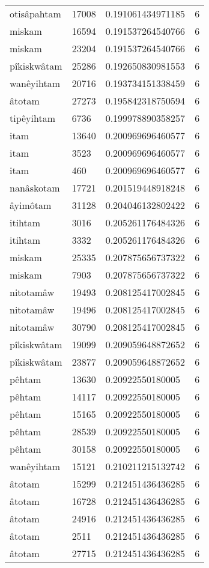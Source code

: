 \begin{longtable}{llll}
otisâpahtam & 17008 & 0.191061434971185 & 6 \\
miskam & 16594 & 0.191537264540766 & 6 \\
miskam & 23204 & 0.191537264540766 & 6 \\
pîkiskwâtam & 25286 & 0.192650830981553 & 6 \\
wanêyihtam & 20716 & 0.193734151338459 & 6 \\
âtotam & 27273 & 0.195842318750594 & 6 \\
tipêyihtam & 6736 & 0.199978890358257 & 6 \\
itam & 13640 & 0.200969696460577 & 6 \\
itam & 3523 & 0.200969696460577 & 6 \\
itam & 460 & 0.200969696460577 & 6 \\
nanâskotam & 17721 & 0.201519448918248 & 6 \\
âyimôtam & 31128 & 0.204046132802422 & 6 \\
itihtam & 3016 & 0.205261176484326 & 6 \\
itihtam & 3332 & 0.205261176484326 & 6 \\
miskam & 25335 & 0.207875656737322 & 6 \\
miskam & 7903 & 0.207875656737322 & 6 \\
nitotamâw & 19493 & 0.208125417002845 & 6 \\
nitotamâw & 19496 & 0.208125417002845 & 6 \\
nitotamâw & 30790 & 0.208125417002845 & 6 \\
pîkiskwâtam & 19099 & 0.209059648872652 & 6 \\
pîkiskwâtam & 23877 & 0.209059648872652 & 6 \\
pêhtam & 13630 & 0.20922550180005 & 6 \\
pêhtam & 14117 & 0.20922550180005 & 6 \\
pêhtam & 15165 & 0.20922550180005 & 6 \\
pêhtam & 28539 & 0.20922550180005 & 6 \\
pêhtam & 30158 & 0.20922550180005 & 6 \\
wanêyihtam & 15121 & 0.210211215132742 & 6 \\
âtotam & 15299 & 0.212451436436285 & 6 \\
âtotam & 16728 & 0.212451436436285 & 6 \\
âtotam & 24916 & 0.212451436436285 & 6 \\
âtotam & 2511 & 0.212451436436285 & 6 \\
âtotam & 27715 & 0.212451436436285 & 6 \\

\end{longtable}
